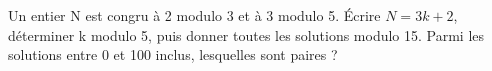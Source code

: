 \documentclass[11pt]{article}
\begin{document}
Un entier N est congru à 2 modulo 3 et à 3 modulo 5. Écrire \(N = 3k + 2\), déterminer k modulo 5, puis donner toutes les solutions modulo 15. Parmi les solutions entre 0 et 100 inclus, lesquelles sont paires ?\par
\vspace{5pt}
\end{document}
